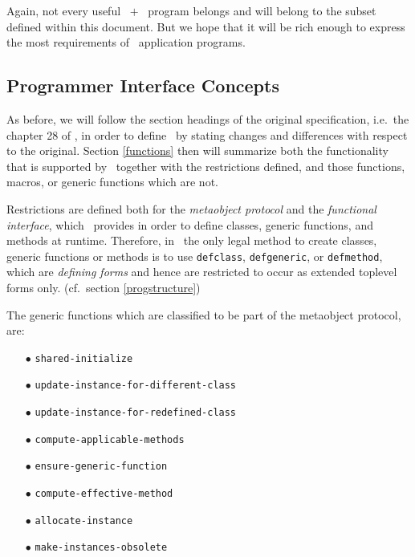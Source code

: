 
Again, not every useful \CL\ $+$ \CLOS\ program belongs and will
belong to the subset defined within this document. But we hope that it
will be rich enough to express the most requirements of \Lisp\
application programs.

\subsection{Programmer Interface Concepts}
\label{concepts}

As before, we will follow the section headings of the original
specification, i.e.\ the chapter 28 of \cite{Steele90}, in order to
define \clos0\ by stating changes and differences with respect to the
original.  Section \ref{functions} then will summarize both the
functionality that is supported by \, together with the
restrictions defined, and those functions, macros, or generic
functions which are not.

Restrictions are defined both for the {\em metaobject protocol} and
the {\em functional interface}, which \CLOS\ provides in order to define
classes, generic functions, and methods at runtime. Therefore, in \clos0\ 
the only legal method to create classes, generic functions or methods is to 
use {\tt defclass}, {\tt defgeneric}, or {\tt defmethod}, which are {\em 
defining forms} and hence are restricted to occur as extended toplevel 
forms only. (cf.\ section \ref{progstructure})

The generic functions which are classified to be part of the
metaobject protocol, are:

\begin{itemize}
\item[$\bullet$] {\tt shared-initialize}
\item[$\bullet$] {\tt update-instance-for-different-class}
\item[$\bullet$] {\tt update-instance-for-redefined-class}
\item[$\bullet$] {\tt compute-applicable-methods}
\item[$\bullet$] {\tt ensure-generic-function}
\item[$\bullet$] {\tt compute-effective-method}
\item[$\bullet$] {\tt allocate-instance}
\item[$\bullet$] {\tt make-instances-obsolete}
\end{itemize}

